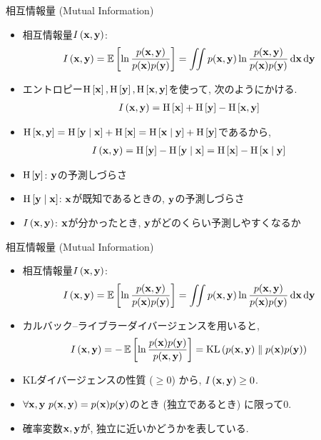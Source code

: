 \documentclass[dvipdfmx,notheorems,t]{beamer}
\begin{document}
\begin{frame}{相互情報量 (Mutual Information)}
\begin{itemize}
  \item 相互情報量$I \left( \vb{x}, \vb{y} \right)$:
  \begin{align*}
    I \left( \vb{x}, \vb{y} \right) &= \operatorname{\mathbb{E}} \left[ \ln \frac{p(\vb{x}, \vb{y})}{p(\vb{x}) p(\vb{y})} \right]
      = \iint p(\vb{x}, \vb{y}) \ln \frac{p(\vb{x}, \vb{y})}{p(\vb{x}) p(\vb{y})} \dd{\vb{x}} \dd{\vb{y}}
  \end{align*}
  \item エントロピー$\operatorname{H} \left[ \vb{x} \right], \operatorname{H} \left[ \vb{y} \right], \operatorname{H} \left[ \vb{x}, \vb{y} \right]$を使って, 次のようにかける.
  \begin{align*}
    I \left( \vb{x}, \vb{y} \right) &= \operatorname{H} \left[ \vb{x} \right] + \operatorname{H} \left[ \vb{y} \right] - \operatorname{H} \left[ \vb{x}, \vb{y} \right]
  \end{align*}
  \item $\operatorname{H} \left[ \vb{x}, \vb{y} \right] = \operatorname{H} \left[ \vb{y} \mid \vb{x} \right] + \operatorname{H} \left[ \vb{x} \right]
  = \operatorname{H} \left[ \vb{x} \mid \vb{y} \right] + \operatorname{H} \left[ \vb{y} \right]$であるから,
  \begin{align*}
    I \left( \vb{x}, \vb{y} \right) &= \operatorname{H} \left[ \vb{y} \right] - \operatorname{H} \left[ \vb{y} \mid \vb{x} \right]
      = \operatorname{H} \left[ \vb{x} \right] - \operatorname{H} \left[ \vb{x} \mid \vb{y} \right]
  \end{align*}
  \item $\operatorname{H} \left[ \vb{y} \right]$: $\vb{y}$の予測しづらさ
  \item $\operatorname{H} \left[ \vb{y} \mid \vb{x} \right]$: $\vb{x}$が既知であるときの, $\vb{y}$の予測しづらさ
  \item $I \left( \vb{x}, \vb{y} \right)$: $\vb{x}$が分かったとき, $\vb{y}$がどのくらい予測しやすくなるか
\end{itemize}
\end{frame}

\begin{frame}{相互情報量 (Mutual Information)}
\begin{itemize}
  \item 相互情報量$I \left( \vb{x}, \vb{y} \right)$:
  \begin{align*}
    I \left( \vb{x}, \vb{y} \right) &= \operatorname{\mathbb{E}} \left[ \ln \frac{p(\vb{x}, \vb{y})}{p(\vb{x}) p(\vb{y})} \right]
      = \iint p(\vb{x}, \vb{y}) \ln \frac{p(\vb{x}, \vb{y})}{p(\vb{x}) p(\vb{y})} \dd{\vb{x}} \dd{\vb{y}}
  \end{align*}
  \item カルバック--ライブラーダイバージェンスを用いると,
  \begin{align*}
    I \left( \vb{x}, \vb{y} \right) &= -\operatorname{\mathbb{E}} \left[ \ln \frac{p(\vb{x}) p(\vb{y})}{p(\vb{x}, \vb{y})} \right]
      = \operatorname{KL} \left( p(\vb{x}, \vb{y}) \parallel p(\vb{x}) p(\vb{y}) \right)
  \end{align*}
  \item KLダイバージェンスの性質 ($\ge 0$) から, $I \left( \vb{x}, \vb{y} \right) \ge 0$.
  \item $\forall \vb{x}, \vb{y} \ p(\vb{x}, \vb{y}) = p(\vb{x}) p(\vb{y})$のとき (独立であるとき) に限って$0$.
  \item 確率変数$\vb{x}, \vb{y}$が, 独立に近いかどうかを表している.
\end{itemize}
\end{frame}
\end{document}
